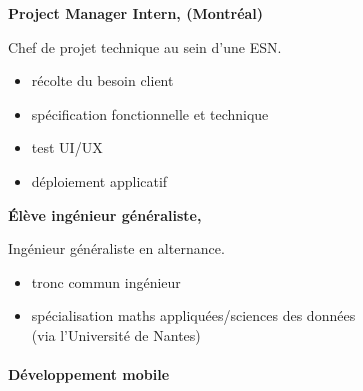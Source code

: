 \documentclass{cv}
\begin{document}
\begin{minipage}[t]{.65\textwidth}
\begin{expbox}[title={déc. 2016, \faicon{clock-o} 3 ans}]
\end{expbox}

\begin{expbox}[title={mai 2018, \faicon{clock-o} 4 mois}]

	\begin{minipage}[t]{\logoboxwidth}
	\centering
	\end{minipage}
	\begin{minipage}[t]{0.8\textwidth}
	\textbf{Project Manager Intern, \adfab{} (Montréal)} 

	Chef de projet technique au sein d'une ESN.

	\begin{itemize}
	\item récolte du besoin client
	\item spécification fonctionnelle et technique
	\item test UI/UX
	\item déploiement applicatif
	\end{itemize}
	\end{minipage}

\end{expbox}

\begin{expbox}[title={2016 -- 2019}]

	\begin{minipage}[t]{\logoboxwidth}
	\centering
	\end{minipage}
	\begin{minipage}[t]{0.8\textwidth}
	\textbf{Élève ingénieur généraliste, \ecn{}} 

	Ingénieur généraliste en alternance.

	\begin{itemize}
	\item tronc commun ingénieur
	\item spécialisation maths appliquées/sciences des données\\ (via l'Université de Nantes)
	\end{itemize}
	\end{minipage}

\end{expbox}
\end{minipage}



\paragraph{Développement mobile} 
   
\end{document}

